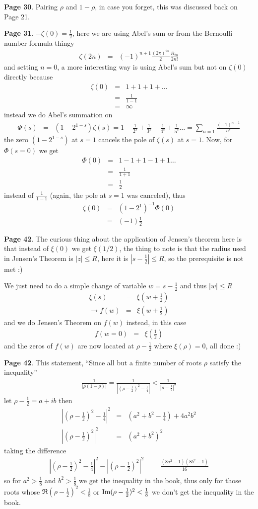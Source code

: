 \documentclass[aps,preprint,preprintnumbers,nofootinbib,showpacs,prd]{revtex4-1}
\newcommand{\nbea}{\begin{eqnarray*}}
\newcommand{\neea}{\end{eqnarray*}}
\def\Im{\rm Im}
\begin{document}
{\bf Page 30}. Pairing $\rho$ and $1-\rho$, in case you forget, this was discussed back on Page 21.

{\bf Page 31}. $-\zeta(0) = \frac{1}{2}$, here we are using Abel's sum or from the Bernoulli number formula thingy
%
\nbea
\zeta(2n) & = & (-1)^{n+1} \frac{(2\pi)^{2n}}{2} \frac{B_{2n}}{2n!}
\neea
%
and setting $n = 0$, a more interesting way is using Abel's sum but not on $\zeta(0)$ directly because
%
\nbea
\zeta(0) & = & 1 + 1 + 1 + \dots \\
& = & \frac{1}{1-1} \\
& = & \infty
\neea
%
instead we do Abel's summation on 
%
\nbea
\Phi(s) & = & (1 - 2^{1-s})\zeta(s) = 1 - \frac{1}{2^s} + \frac{1}{3^s} - \frac{1}{4^s} + \frac{1}{5^s} \dots = \sum_{n=1}\frac{(-1)^{n-1}}{n^s}
\neea
%
the zero $(1 - 2^{1-s})$ at $s = 1$ cancels the pole of $\zeta(s)$ at $s=1$. Now, for $\Phi(s=0)$ we get
%
\nbea
\Phi(0) & = & 1 - 1 + 1 - 1 + 1 \dots \\
& = & \frac{1}{1 + 1} \\
& = & \frac{1}{2}
\neea
%
instead of $\frac{1}{1-1}$ (again, the pole at $s = 1$ was canceled), thus
%
\nbea
\zeta(0) & = & (1 - 2^{1})^{-1} \Phi(0) \\
& = & (-1) \frac{1}{2}
\neea
%

{\bf Page 42}. The curious thing about the application of Jensen's theorem here is that instead of $\xi(0)$ we get $\xi(1/2)$, the thing to note is that the radius used in Jensen's Theorem is $|z| \le R$, here it is $|s-\frac{1}{2}| \le R$, so the prerequisite is not met :)

We just need to do a simple change of variable $w = s - \frac{1}{2}$ and thus $|w| \le R$
%
\nbea
\xi(s) & = & \xi(w + \frac{1}{2}) \\
\to f(w) & = & \xi(w + \frac{1}{2})
\neea
%
and we do Jensen's Theorem on $f(w)$ instead, in this case
%
\nbea
f(w = 0) & = & \xi\left(\frac{1}{2}\right)
\neea
%
and the zeros of $f(w)$ are now located at $\rho-\frac{1}{2}$ where $\xi(\rho) = 0$, all done :)

{\bf Page 42}. This statement, ``Since all but a finite number of roots $\rho$ satisfy the inequality''
%
\nbea
\frac{1}{|\rho(1-\rho)|} = \frac{1}{|(\rho-\frac{1}{2})^2 - \frac{1}{4}|} < \frac{1}{|\rho-\frac{1}{2}|^2}
\neea
%
let $\rho - \frac{1}{2} = a + ib$ then
%
\nbea
|(\rho-\frac{1}{2})^2 - \frac{1}{4}|^2 & = & (a^2 + b^2 - \frac{1}{4}) + 4a^2b^2 \\
|(\rho-\frac{1}{2})^2|^2 & = & (a^2 + b^2)^2
\neea
%
taking the difference
%
\nbea
|(\rho-\frac{1}{2})^2 - \frac{1}{4}|^2 - |(\rho-\frac{1}{2})^2|^2 & = & \frac{(8a^2 - 1)(8b^2 - 1)}{16}
\neea
%
so for $a^2 > \frac{1}{8}$ and $b^2 > \frac{1}{8}$ we get the inequality in the book, thus only for those roots whose $\Re(\rho-\frac{1}{2})^2 < \frac{1}{8}$ or $\Im(\rho-\frac{1}{2})^2 < \frac{1}{8}$ we don't get the inequality in the book.
\end{document}
